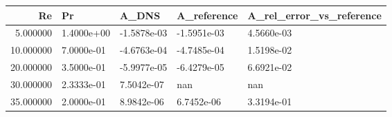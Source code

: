 \begin{tabular}{rllll}
\toprule
Re & Pr & A_DNS & A_reference & A_rel_error_vs_reference \\
\midrule
5.000000 & 1.4000e+00 & -1.5878e-03 & -1.5951e-03 & 4.5660e-03 \\
10.000000 & 7.0000e-01 & -4.6763e-04 & -4.7485e-04 & 1.5198e-02 \\
20.000000 & 3.5000e-01 & -5.9977e-05 & -6.4279e-05 & 6.6921e-02 \\
30.000000 & 2.3333e-01 & 7.5042e-07 & nan & nan \\
35.000000 & 2.0000e-01 & 8.9842e-06 & 6.7452e-06 & 3.3194e-01 \\
\bottomrule
\end{tabular}
